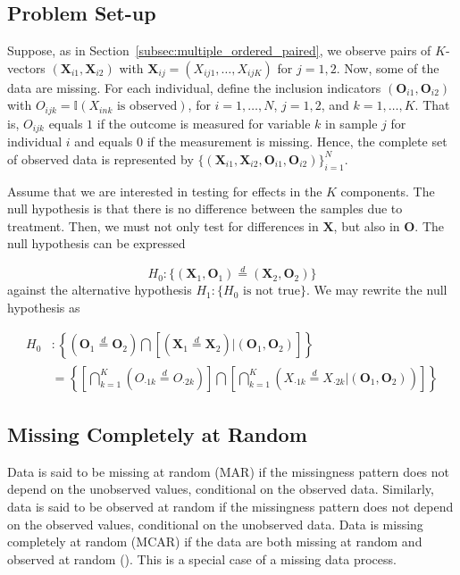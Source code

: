\documentclass[12pt]{article}
\newcommand{\ind}{\mathbb{I}} %
\newcommand{\eqd}{\stackrel{d}{=}} %
\begin{document}
\subsection{Problem Set-up}
Suppose, as in Section~\ref{subsec:multiple_ordered_paired}, we observe pairs of $K$-vectors $(\mathbf{X}_{i1}, \mathbf{X}_{i2})$ with $\mathbf{X}_{ij} = (X_{ij1}, \dots, X_{ijK})$ for $j=1,2$.
Now, some of the data are missing.
For each individual, define the inclusion indicators $(\mathbf{O}_{i1}, \mathbf{O}_{i2})$ with $O_{ijk} = \ind{(X_{ink} \text{ is observed})}$, for $i = 1,\dots,N$, $j = 1,2$, and $k = 1,\dots, K$.
That is, $O_{ijk}$ equals $1$ if the outcome is measured for variable $k$ in sample $j$ for individual $i$ and equals $0$ if the measurement is missing.
Hence, the complete set of observed data is represented by $\{(\mathbf{X}_{i1}, \mathbf{X}_{i2}, \mathbf{O}_{i1}, \mathbf{O}_{i2})\}_{i=1}^N$.

Assume that we are interested in testing for effects in the $K$ components.
The null hypothesis is that there is no difference between the samples due to treatment.
Then, we must not only test for differences in $\mathbf{X}$, but also in $\mathbf{O}$.
The null hypothesis can be expressed

$$H_0: \{ (\mathbf{X}_1, \mathbf{O}_1) \eqd (\mathbf{X}_2, \mathbf{O}_2) \}$$
against the alternative hypothesis $H_1: \{H_0 \text{ is not true}\}$.
We may rewrite the null hypothesis as

\begin{align*}
H_0 &: \left\lbrace \left( \mathbf{O}_1 \eqd \mathbf{O}_2 \right) \bigcap  \left[ \left( \mathbf{X}_1 \eqd \mathbf{X}_2 \right) \big\vert (\mathbf{O}_1, \mathbf{O}_2) \right]\right\rbrace \\
&= \left\lbrace \left[ \bigcap_{k=1}^K \left(O_{\cdot 1k} \eqd O_{\cdot 2 k} \right) \right] \bigcap \left[ \bigcap_{k=1}^K \left( X_{\cdot 1k} \eqd X_{\cdot 2k}  \big\vert (\mathbf{O}_1, \mathbf{O}_2) \right)\right]\right\rbrace
\end{align*}

\subsection{Missing Completely at Random}
Data is said to be missing at random (MAR) if the missingness pattern does not depend on the unobserved values, conditional on the observed data.
Similarly, data is said to be observed at random if the missingness pattern does not depend on the observed values, conditional on the unobserved data.
Data is missing completely at random (MCAR) if the data are both missing at random and observed at random (\cite{rubin_inference_1976}).
This is a special case of a missing data process.
\end{document}
